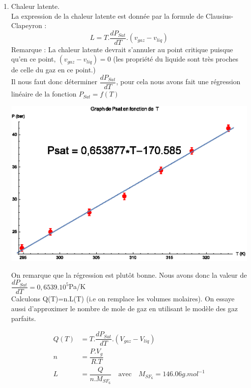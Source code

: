 \documentclass[12pt,a4paper]{article}
\begin{document}
\begin{enumerate}
\item Chaleur latente. \\
La expression de la chaleur latente est donnée par la formule de Clausius-Clapeyron : \[L=T.\dfrac {dP_{Sat}} {dT}.(v_{gaz}-v_{liq})\]
Remarque : La chaleur latente devrait s’annuler au point critique puisque qu'en ce point, $(v_{gaz}-v_{liq})=0$ (les propriété du liquide sont très proches de celle du gaz en ce point.)  \\
Il nous faut donc déterminer $\dfrac {dP_{Sat}} {dT}$, pour cela nous avons fait une régression linéaire de la fonction $P_{Sat}=f(T)$\\
\begin{center}
\includegraphics[scale=0.75]{RegressionPsat.eps}
\end{center}
On remarque que la régression est plutôt bonne.
Nous avons donc la valeur de $\dfrac {dP_{Sat}} {dT}=0,6539.10^{5} $Pa/K\\
Calculons Q(T)=n.L(T) (i.e on remplace les volumes molaires).
On essaye aussi d'approximer le nombre de mole de gaz en utilisant le modèle des gaz parfaits.

\begin{align}
Q(T)&=T.\dfrac {dP_{Sat}} {dT}.(V_{gaz}-V_{liq})\\
n&=\dfrac{P.V_{g}}{R.T} \\
L&=\dfrac{Q}{n.M_{SF_{6}}} \quad \text{avec} \quad M_{SF_{6}}=146.06 g.mol^{-1}
\end{align}


\end{enumerate}
\end{document}
